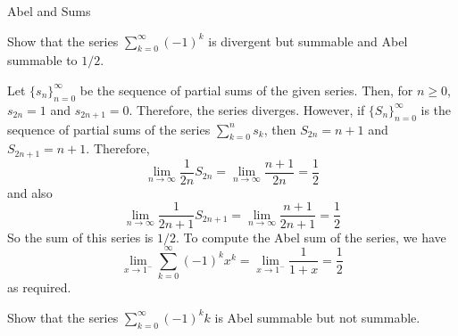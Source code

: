 \begin{section}{Abel and \cesaro Sums}
\begin{ex}
	Show that the series $\sum_{k=0}^\infty (-1)^k$ is divergent
	but \cesaro summable and Abel summable to $1/2$.
\end{ex}

\begin{soln}
	Let $\{s_n\}_{n=0}^\infty$ be the sequence of partial sums of
	the given series. Then, for $n \geq 0$, $s_{2n} = 1$ and
	$s_{2n+1} = 0$. Therefore, the series diverges. However, if
	$\{S_n\}_{n=0}^\infty$ is the sequence of partial sums of the
	series $\sum_{k=0}^n s_k$, then $S_{2n} = n+1$ and $S_{2n+1}
	= n+1$. Therefore,
		\begin{displaymath}
			\lim_{n \rightarrow \infty} \frac{1}{2n} S_{2n}
				= \lim_{n \rightarrow \infty} \frac{n+1}{2n}
				= \frac{1}{2}
		\end{displaymath}
	and also
		\begin{displaymath}
			\lim_{n \rightarrow \infty} \frac{1}{2n+1} S_{2n+1}
				= \lim_{n \rightarrow \infty} \frac{n+1}{2n+1}
				= \frac{1}{2}
		\end{displaymath}
	So the \cesaro sum of this series is $1/2$.
	To compute the Abel sum of the series, we have
		\begin{displaymath}
			\lim_{x \rightarrow 1^-}\sum_{k=0}^\infty (-1)^k x^k
				= \lim_{x \rightarrow 1^-} \frac{1}{1+x}
				= \frac{1}{2}
		\end{displaymath}
	as required.
\end{soln}


\begin{ex}
	Show that the series $\sum_{k=0}^\infty (-1)^k k$ is
	Abel summable but not \cesaro summable.
\end{ex}


\end{section}
